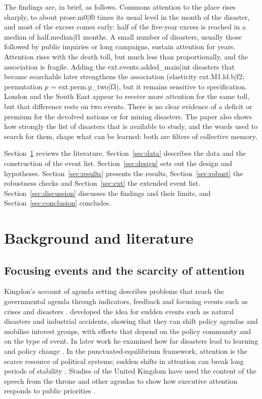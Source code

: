 \documentclass[11pt,a4paper]{article}
\begin{document}
The findings are, in brief, as follows. Commons attention to the place rises sharply, to about {{prose.m0|f0}} times its usual level in the month of the disaster, and most of the excess comes early: half of the five-year excess is reached in a median of {{half.median|f1}} months. A small number of disasters, usually those followed by public inquiries or long campaigns, sustain attention for years. Attention rises with the death toll, but much less than proportionally, and the association is fragile. Adding the {{ext.events.added_main|int}} disasters that became searchable later strengthens the association (elasticity {{ext.M1.ld.b|f2}}; permutation $p$ = {{ext.perm.p_two|f3}}), but it remains sensitive to specification. London and the South East appear to receive more attention for the same toll, but that difference rests on two events. There is no clear evidence of a deficit or premium for the devolved nations or for mining disasters. The paper also shows how strongly the list of disasters that is available to study, and the words used to search for them, shape what can be learned: both are filters of collective memory.

Section~\ref{sec:lit} reviews the literature. Section~\ref{sec:data} describes the data and the construction of the event list. Section~\ref{sec:design} sets out the design and hypotheses. Section~\ref{sec:results} presents the results, Section~\ref{sec:robust} the robustness checks and Section~\ref{sec:ext} the extended event list. Section~\ref{sec:discussion} discusses the findings and their limits, and Section~\ref{sec:conclusion} concludes.

\section{Background and literature}
\label{sec:lit}
\subsection{Focusing events and the scarcity of attention}
Kingdon's account of agenda setting describes problems that reach the governmental agenda through indicators, feedback and focusing events such as crises and disasters \citep{Kingdon1984}. \citet{Birkland1997,Birkland1998} developed the idea for sudden events such as natural disasters and industrial accidents, showing that they can shift policy agendas and mobilise interest groups, with effects that depend on the policy community and on the type of event. In later work he examined how far disasters lead to learning and policy change \citep{Birkland2006}. In the punctuated-equilibrium framework, attention is the scarce resource of political systems; sudden shifts in attention can break long periods of stability \citep{BaumgartnerJones1993,JonesBaumgartner2005}. Studies of the United Kingdom have used the content of the speech from the throne and other agendas to show how executive attention responds to public priorities \citep{JenningsJohn2009,John2013}.
\end{document}
